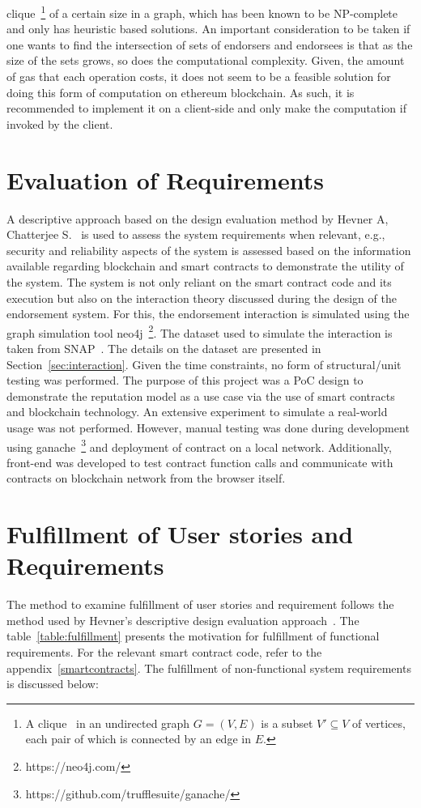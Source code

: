 clique~\footnote{A clique~\cite{cormen2009introduction} in an undirected graph
	$G = ( V,E)$ is a subset $V' \subseteq V$ of vertices, each pair of which
is connected by an edge in $E$.} of a certain size in a graph, which has been
known to be NP-complete and only has heuristic based solutions.  An important
consideration to be taken if one wants to find the intersection of sets of
endorsers and endorsees is that as the size of the sets grows, so does the
computational complexity. Given, the amount of gas that each operation costs,
it does not seem to be a feasible solution for doing this form of computation
on ethereum blockchain. As such, it is recommended to implement it on a
client-side and only make the computation if invoked by the client.

\section{Evaluation of Requirements}
A descriptive approach based on the design evaluation method by Hevner A,
Chatterjee S.~\cite{hevner2010design} is used to assess the system requirements
when relevant, e.g., security and reliability aspects of the system is assessed
based on the information available regarding blockchain and smart contracts to
demonstrate the utility of the system. The system is not only reliant on the
smart contract code and its execution but also on the interaction theory
discussed during the design of the endorsement system. For this, the
endorsement interaction is simulated using the graph simulation tool
neo4j~\footnote{https://neo4j.com/}. The dataset used to simulate the
interaction is taken from SNAP~\cite{snapnets}. The details on the dataset are
presented in Section~\ref{sec:interaction}. Given the time constraints, no form
of structural/unit testing was performed. The purpose of this project was a PoC
design to demonstrate the reputation model as a use case via the use of smart
contracts and blockchain technology. An extensive experiment to simulate a
real-world usage was not performed. However, manual testing was done during
development using ganache~\footnote{https://github.com/trufflesuite/ganache/}
and deployment of contract on a local network. Additionally, front-end was
developed to test contract function calls and communicate with contracts on
blockchain network from the browser itself.  

\section{Fulfillment of User stories and Requirements}\label{fulfillment}
The method to examine fulfillment of user stories and requirement follows the
method used by Hevner's descriptive design evaluation
approach~\cite{hevner2010design}. The table~\ref{table:fulfillment} presents
the motivation for fulfillment of functional requirements. For the relevant
smart contract code, refer to the appendix~\ref{smartcontracts}. 
The fulfillment of non-functional system requirements is discussed below:
